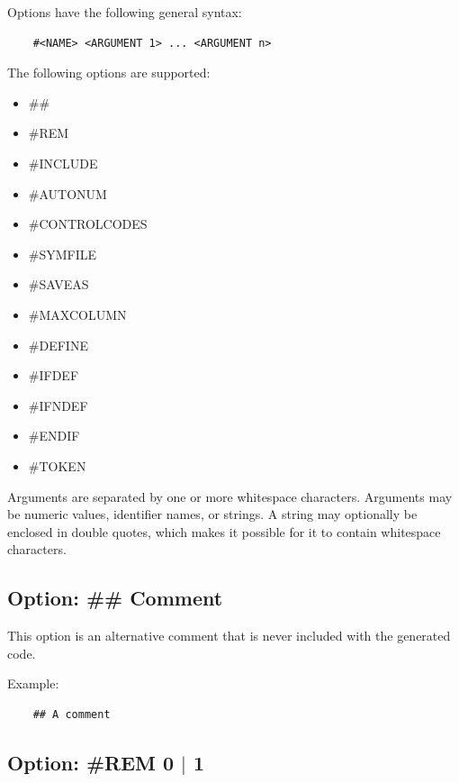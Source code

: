 \documentclass{article}
\begin{document}
        Options have the following general syntax:

        \begin{verbatim}
    #<NAME> <ARGUMENT 1> ... <ARGUMENT n>
        \end{verbatim}

        The following options are supported:

        \begin{itemize}
            \item \#\#
            \item \#REM
            \item \#INCLUDE
            \item \#AUTONUM
            \item \#CONTROLCODES
            \item \#SYMFILE
            \item \#SAVEAS
            \item \#MAXCOLUMN
            \item \#DEFINE
            \item \#IFDEF
            \item \#IFNDEF
            \item \#ENDIF
            \item \#TOKEN
        \end{itemize}

        Arguments are separated by one or more whitespace characters.
        Arguments may be numeric values, identifier names, or strings. 
        A string may optionally be enclosed in double quotes, which makes it possible 
        for it to contain whitespace characters.

    \subsection{Option: \#\# Comment}

        This option is an alternative comment that is never included with the generated
        code.

        Example:

        \begin{verbatim}
    ## A comment
        \end{verbatim}

    \subsection{Option: \#REM 0 $|$ 1}
\end{document}
